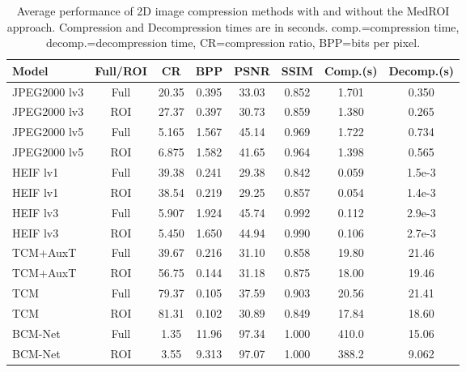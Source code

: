 \documentclass[runningheads]{llncs}
\begin{document}
\begin{table}[!bht]
\centering
\footnotesize
\begin{tabular}{lccccccc}
\toprule
\textbf{Model} &
\textbf{Full/ROI} &
\textbf{CR} &
\textbf{BPP} &
\textbf{PSNR} &
\textbf{SSIM} &
\textbf{Comp.(s)} &
\textbf{Decomp.(s)} \\
\midrule
JPEG2000 lv3 & Full & 20.35 & 0.395 & 33.03 & 0.852 & 1.701 & 0.350 \\
JPEG2000 lv3 & ROI  & 27.37 & 0.397 & 30.73 & 0.859 & 1.380 & 0.265 \\
\midrule
JPEG2000 lv5 & Full & 5.165 & 1.567 & 45.14 & 0.969 & 1.722 & 0.734 \\
JPEG2000 lv5 & ROI  & 6.875 & 1.582 & 41.65 & 0.964 & 1.398 & 0.565 \\
\midrule
HEIF lv1 & Full & 39.38 & 0.241 & 29.38 & 0.842 & 0.059 & 1.5e-3\\ %
HEIF lv1 & ROI  & 38.54 & 0.219 & 29.25 & 0.857 & 0.054 & 1.4e-3\\ %
\midrule
HEIF lv3 & Full & 5.907 & 1.924 & 45.74 & 0.992 & 0.112 & 2.9e-3\\ %
HEIF lv3 & ROI  & 5.450 & 1.650 & 44.94 & 0.990 & 0.106 & 2.7e-3\\ %
\midrule
TCM+AuxT & Full & 39.67 & 0.216 & 31.10 & 0.858 & 19.80 & 21.46 \\
TCM+AuxT & ROI  & 56.75 & 0.144 & 31.18 & 0.875 & 18.00 & 19.46 \\
\midrule
TCM & Full & 79.37 & 0.105 & 37.59 & 0.903 & 20.56 & 21.41 \\
TCM & ROI  & 81.31 & 0.102 & 30.89 & 0.849 & 17.84 & 18.60 \\
\midrule
BCM-Net & Full & 1.35 & 11.96 & 97.34 & 1.000 & 410.0 & 15.06 \\
BCM-Net & ROI  & 3.55 & 9.313 & 97.07 & 1.000 & 388.2 & 9.062 \\

\bottomrule
\end{tabular}
\caption{Average performance of 2D image compression methods with and without the MedROI approach. Compression and Decompression times are in seconds. comp.=compression time, decomp.=decompression time, CR=compression ratio, BPP=bits per pixel.}
\label{tab:compression_results}
\end{table}
\end{document}
